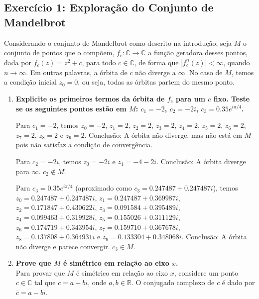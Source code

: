 \subsection{Exercício 1: Exploração do Conjunto de Mandelbrot}

Considerando o conjunto de Mandelbrot como descrito na introdução, seja \( M \) o
conjunto de pontos que o compõem, \( f_c : \mathbb{C} \to \mathbb{C} \) a função geradora desses pontos, dada por \( f_c (z) = z^2 + c \), para todo
\( c \in \mathbb{C} \), de forma que \( |f_c^n (z)| < \infty \), quando \( n \to \infty \). Em outras palavras, a órbita de \( c \) não diverge a \( \infty \). No caso de
\( M \), temos a condição inicial \( z_0 = 0 \), ou seja, todas as órbitas partem do mesmo ponto.

\begin{enumerate}[label=(\alph*)]
    \item \textbf{Explicite os primeiros termos da órbita de \( f_c \) para um \( c \) fixo. Teste se os seguintes pontos estão em \( M \): \( c_1 = -2 \), \( c_2 = -2i \), \( c_3 = 0.35 e^{i\pi/4} \).}
    
        Para \( c_1 = -2 \), temos \( z_0 = -2 \), \( z_1 = 2 \), \( z_2 = 2 \), \( z_3 = 2 \), \( z_4 = 2 \), \( z_5 = 2 \), \( z_6 = 2 \), \( z_7 = 2 \), \( z_8 = 2 \) e \( z_9 = 2 \). Conclusão: A órbita não diverge, mas não está em \( M \) pois não satisfaz a condição de convergência.

        Para \( c_2 = -2i \), temos \( z_0 = -2i \) e \( z_1 = -4 - 2i \). Conclusão: A órbita diverge para \( \infty \). \( c_2 \notin M \).

        Para \( c_3 = 0.35 e^{i\pi/4} \) (aproximado como \( c_3 = 0.247487 + 0.247487i \)), temos \( z_0 = 0.247487 + 0.247487i \), \( z_1 = 0.247487 + 0.369987i \), \( z_2 = 0.171847 + 0.430622i \), \( z_3 = 0.091584 + 0.395489i \), \( z_4 = 0.099463 + 0.319928i \), \( z_5 = 0.155026 + 0.311129i \), \( z_6 = 0.174719 + 0.343954i \), \( z_7 = 0.159710 + 0.367678i \), \( z_8 = 0.137808 + 0.364931i \) e \( z_9 = 0.133304 + 0.348068i \). Conclusão: A órbita não diverge e parece convergir. \( c_3 \in M \).

    

    \item \textbf{Prove que \( M \) é simétrico em relação ao eixo \( x \).} \\

        Para provar que \( M \) é simétrico em relação ao eixo \( x \), considere um ponto \( c \in \mathbb{C} \) tal que \( c = a + bi \), onde \( a, b \in \mathbb{R} \). O conjugado complexo de \( c \) é dado por \( \overline{c} = a - bi \).


\end{enumerate}

